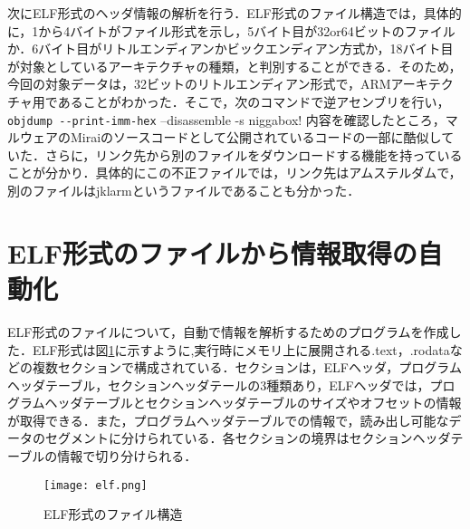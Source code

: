 \documentclass[dvipdfmx]{bta}
\begin{document}
次にELF形式のヘッダ情報の解析を行う．ELF形式のファイル構造では，具体的に，1から4バイトがファイル形式を示し，5バイト目が32or64ビットのファイルか．6バイト目がリトルエンディアンかビックエンディアン方式か，18バイト目が対象としているアーキテクチャの種類，と判別することができる．そのため，今回の対象データは，32ビットのリトルエンディアン形式で，ARMアーキテクチャ用であることがわかった．そこで，次のコマンドで逆アセンブリを行い，
\verb!objdump --print-imm-hex!
--disassemble -s niggabox!
内容を確認したところ，マルウェアのMiraiのソースコード\cite{Mirai}として公開されているコードの一部に酷似していた．さらに，リンク先から別のファイルをダウンロードする機能を持っていることが分かり．具体的にこの不正ファイルでは，リンク先はアムステルダムで，別のファイルはjklarmというファイルであることも分かった．



\section{ELF形式のファイルから情報取得の自動化}
ELF形式のファイルについて，自動で情報を解析するためのプログラムを作成した．ELF形式は図\ref{fig:elf}に示すように,実行時にメモリ上に展開される.text，.rodataなどの複数セクションで構成されている．セクションは，ELFヘッダ，プログラムヘッダテーブル，セクションヘッダテールの3種類あり，ELFヘッダでは，プログラムヘッダテーブルとセクションヘッダテーブルのサイズやオフセットの情報が取得できる．また，プログラムヘッダテーブルでの情報で，読み出し可能なデータのセグメントに分けられている．各セクションの境界はセクションヘッダテーブルの情報で切り分けられる．
\begin{figure}[htbp]
	\centering
 	\texttt{[image: elf.png]}
 	\caption{ELF形式のファイル構造}\label{fig:elf}
\end{figure}
\end{document}
